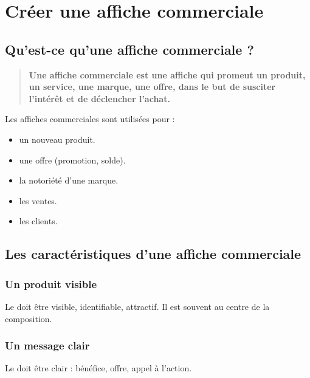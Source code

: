\section{Créer une affiche commerciale}

\subsection{Qu'est-ce qu'une affiche commerciale ?}

\begin{quote}
\textbf{Une affiche commerciale est une affiche qui promeut un produit, un service, une marque, une offre, dans le but de susciter l'intérêt et de déclencher l'achat.}
\end{quote}

Les affiches commerciales sont utilisées pour :

\begin{itemize}
    \item {} un nouveau produit.
    \item {} une offre (promotion, solde).
    \item {} la notoriété d'une marque.
    \item {} les ventes.
    \item {} les clients.
\end{itemize}

\subsection{Les caractéristiques d'une affiche commerciale}

\subsubsection{Un produit visible}

Le  doit être visible, identifiable, attractif. Il est souvent au centre de la composition.

\subsubsection{Un message clair}

Le  doit être clair : bénéfice, offre, appel à l'action.


